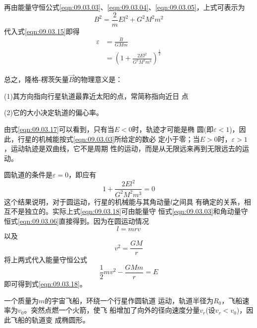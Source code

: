 \clearpage\noindent 再由能量守恒公式\eqref{eqn:09.03.03}、\eqref{eqn:09.03.04}、\eqref{eqn:09.03.05}，上式可表示为
\begin{equation}\label{eqn:09.03.16}
  B ^ { 2 } = \frac { 2 } { m } E l ^ { 2 } + G ^ { 2 } M ^ { 2 } m ^ { 2 }
\end{equation}
代入式\eqref{eqn:09.03.15}即得
\begin{equation}\label{eqn:09.03.17}
  \begin{split}
    \varepsilon &= \frac { B } { G M m } \\
    &= \left( 1 + \frac { 2 E l ^ { 2 } } { G ^ { 2 } M ^ { 2 } m ^ { 3 } } \right) ^ { \frac { 1 } { 2 } }
  \end{split}
\end{equation}

总之，隆格-楞茨矢量$ \vec{B} $的物理意义是：

(1)其方向指向行星轨道最靠近太阳的点，常简称指向近日
点

(2)它的大小决定轨道的偏心率。

由式\eqref{eqn:09.03.17}可以看到，只有当$ E<0 $时，轨迹才可能是椭
圆(即$ \varepsilon < 1 $)，因此，行星的机械能\lhbrak 按式\eqref{eqn:09.03.03}所给定的数\rhbrak 必
定小于零；当$ E > 0 $时，$ \varepsilon > 1 $，运动轨迹是双曲线，它不是周期
性的运动，而是从无限远来再到无限远去的运动。

圆轨道的条件是$ \varepsilon = 0 $，即应有
\begin{equation}\label{eqn:09.03.18}
  1 + \frac { 2 E l ^ { 2 } } { G ^ { 2 } M ^ { 2 } m ^ { 3 } } = 0
\end{equation}
这个结果说明，对于圆运动，行星的机械能与其角动量$ l $之间具
有确定的关系，相互不是独立的。实际上式\eqref{eqn:09.03.18}可由能量守
恒式\eqref{eqn:09.03.03}和角动量守恒式\eqref{eqn:09.03.06}直接得到。因为在圆运动情况
\begin{equation*}
  l = m r v
\end{equation*}
以及
\begin{equation*}
  v ^ { 2 } = \frac { G M } { r }
\end{equation*}
将上两式代入能量守恒公式
\begin{equation*}
  \frac { 1 } { 2 } m v ^ { 2 } - \frac { G M m } { r } = E
\end{equation*}
即可得到式\eqref{eqn:09.03.18}。

\example 一个质量为$ m $的宇宙飞船，环绕一个行星作圆轨道
运动，轨道半径为$ R _ 0 $，飞船速率为$ v _ 0 $。突然点燃一个火箭，使飞
船增加了向外的径向速度分量$ v _ r $(设$ v _ r < v _ 0$)，因此飞船的轨道变
成椭圆形。

